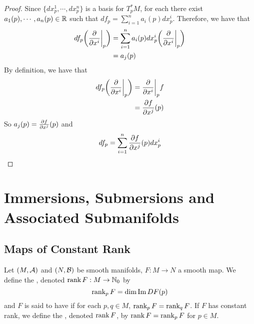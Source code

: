 \documentclass{book}
\begin{document}
	\begin{proof}
		 Since $\{dx^1_p, \cdots, dx^n_p\}$ is a basis for $T^*_pM$, for each there exist $a_1(p), \cdots, a_n(p) \in \mathbb{R}$ such that $df_p = \sum\limits_{i=1}^n a_i(p)dx^i_p$. Therefore, we have that 
		\begin{align*}
			df_p \bigg(\frac{\partial}{\partial x^i} \bigg|_p \bigg) 
			&= \sum\limits_{i=1}^n a_i(p)dx^i_p \bigg(\frac{\partial}{\partial x^i} \bigg|_p \bigg)  \\
			&=  a_j(p)
		\end{align*}
		By definition, we have that 
		\begin{align*}
			df_p\bigg(\frac{\partial}{\partial x^i} \bigg|_p \bigg) 
			&= \frac{\partial}{\partial x^i} \bigg|_p f \\ 
			&= \frac{\partial f}{\partial x^j}(p)\\
		\end{align*}
		So $a_j(p) = \frac{\partial f}{\partial x^j} (p)$ and $$df_p = \sum\limits_{i=1}^n \frac{\partial f}{\partial x^j} (p)dx^i_p$$
	\end{proof}
		
	
	
	
	
	
	
	
	
	
	
	
	
	
	
	
	
	
	
	\newpage
	\chapter{Immersions, Submersions and Associated Submanifolds}
	
	\section{Maps of Constant Rank}
	
	
	\begin{defn} 
		Let $(M, \mathcal{A})$ and $(N, \mathcal{B})$ be smooth manifolds, $F: M \rightarrow N$ a smooth map. We define the , denoted $\operatorname{\text{rank}} F: M \rightarrow \mathbb{N}_0$ by 
		$$\operatorname{\text{rank}}_p F = \dim \text{Im} \, D F(p)$$
		and $F$ is said to have   if for each $p, q \in M$, $\operatorname{\text{rank}}_p F = \operatorname{\text{rank}}_q F$. If $F$ has constant rank, we define the , denoted $\operatorname{\text{rank}} F$, by $\operatorname{\text{rank}} F = \operatorname{\text{rank}}_p F$ for $p \in M$.
	\end{defn}
\end{document}
